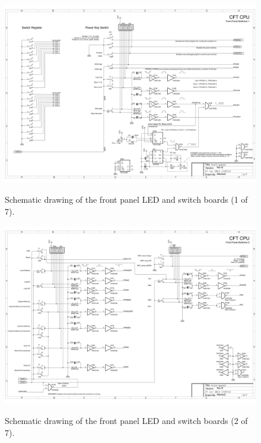 \documentclass[11pt,a4paper,twocolumns]{article}
\begin{document}
\begin{figure}
\centering
\includegraphics[width=0.95\textheight,angle=90]{figs/front-panel-1.jpg}\\
\caption{\label{fig-schematic-front-panel-1}Schematic drawing of the front panel LED and switch boards (1 of 7).}
\end{figure}

\begin{figure}
\centering
\includegraphics[width=0.95\textheight,angle=90]{figs/front-panel-2.jpg}\\
\caption{\label{fig-schematic-front-panel-2}Schematic drawing of the front panel LED and switch boards (2 of 7).}
\end{figure}
\end{document}
